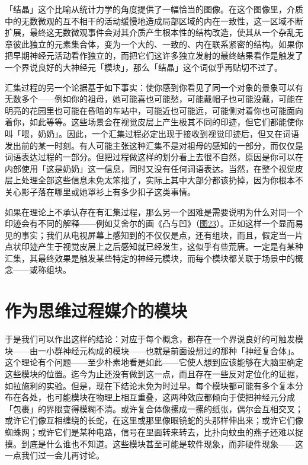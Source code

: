\documentclass[
  12pt,
  twoside,
  openright,
  oldfontcommands,
]{memoir}
\begin{document}
「结晶」这个比喻从统计力学的角度提供了一幅恰当的图像。在这个图像里，介质中的无数微观的互不相干的活动缓慢地造成局部区域的内在一致性，这一区域不断扩展，最终这无数微观事件会对其介质产生根本性的结构改造，使其从一个杂乱无章彼此独立的元素集合体，变为一个大的、一致的、内在联系紧密的结构。如果你把早期神经元活动看作独立的，而把它们这许多独立发射的最终结果看作是触发了一个界说良好的大神经元「模块」，那么「结晶」这个词似乎再贴切不过了。

汇集过程的另一个论据基于如下事实：使你感到你看见了同一个对象的景象可以有无数多个------例如你的祖母，她可能喜也可能愁，可能戴帽子也可能没戴，可能在明亮的花园里也可能在昏暗的车站中，可能近也可能远，可能侧对着你也可能面向着你，如此等等。这些场景会在视觉皮层上产生极其不同的印迹，但它们都能使你叫「喂，奶奶」。因此，一个汇集过程必定出现于接收到视觉印迹后，但又在词语发出前的某一时刻。有人可能主张这种汇集不是对祖母的感知的一部分，而仅仅是词语表达过程的一部分。但把过程做这样的划分看上去很不自然，原因是你可以在内部使用「这是奶奶」这一信息，同时又没有任何词语表达。当然，在整个视觉皮层上处理全部这些信息未免太笨拙了，实际上其中大部分都该扔掉，因为你根本不关心影子落在哪里或她罩衫上有多少扣子这类事情。

如果在理论上不承认存在有汇集过程，那么另一个困难是需要说明为什么对同一个印迹会有不同的解释------例如艾舍尔的画《凸与凹》（\hyperref[fig:23]{图23}）。正如这样一个显而易见的事实；我们从电视屏幕上感知到的不仅仅是点，还有组块，而且，假定当一片点状印迹产生于视觉皮层上之后感知就已经发生，这似乎有些荒唐。一定是有某种汇集，其最终效果是触发某些特定的神经元模块，而每个模块都关联于场景中的概念------或称组块。

\section{作为思维过程媒介的模块}

于是我们可以作出这样的结论：对应于每个概念，都存在一个界说良好的可触发模块------由一小群神经元构成的模块------也就是前面设想过的那种「神经复合体」。这个理论有个问题------至少朴素地看是如此------它使人想到应该能够在大脑里确定这些模块的位置。迄今为止还没有做到这一点，而且存在一些反对定位化的证据，如拉施利的实验。但是，现在下结论未免为时过早。每个模块都可能有多个复本分布在各处，也可能模块在物理上相互重叠，这两种效应都倾向于使把神经元分成「包裹」的界限变得模糊不清。或许复合体像摞成一摞的纸张，偶尔会互相交叉；或许它们像互相缠绕的长蛇，在这里或那里像眼镜蛇的头那样伸出来；或许它们像蜘蛛网；或许它们是某种电路，信号在里面转来转去，比扑向蚊虫的燕子还难以捉摸。到底是什么谁也不知道。这些模块甚至可能是软件现象，而非硬件现象------这一点我们过一会儿再讨论。
\end{document}
